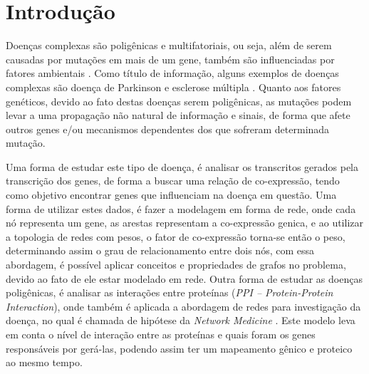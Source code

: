 \newcommand{\itab}[1]{\hspace{0em}\rlap{#1}}
\newcommand{\tab}[1]{\hspace{.2\textwidth}\rlap{#1}}
\chapter[Introdução]{Introdução}


Doenças complexas são poligênicas e multifatoriais, ou seja, além de serem causadas por mutações em mais de um gene, também são influenciadas por fatores ambientais \cite{davey-mith}. Como título de informação, alguns exemplos de doenças complexas são doença de Parkinson e esclerose múltipla \cite{Hunter-2005}. Quanto aos fatores genéticos, devido ao fato destas doenças serem poligênicas, as mutações podem levar a uma propagação não natural de informação e sinais, de forma que afete outros genes e/ou mecanismos dependentes dos que sofreram determinada mutação.




Uma forma de estudar este tipo de doença, é analisar os transcritos gerados pela transcrição dos genes, de forma a buscar uma relação de co-expressão, tendo como objetivo encontrar genes que influenciam na doença em questão. Uma forma de utilizar estes dados, é fazer a modelagem em forma de rede, onde cada nó representa um gene, as arestas representam a co-expressão genica, e ao utilizar a topologia de redes com pesos, o fator de co-expressão torna-se então o peso, determinando assim o grau de relacionamento entre dois nós, com essa abordagem, é possível aplicar conceitos e propriedades de grafos no problema, devido ao fato de ele estar modelado em rede.
Outra forma de estudar as doenças poligênicas, é analisar as interações entre proteínas (\textsl{PPI – Protein-Protein Interaction}), onde também é aplicada a abordagem de redes para investigação da doença, no qual é chamada de hipótese da \textsl{Network Medicine} \cite{Barabasi2011}. Este modelo leva em conta o nível de interação entre as proteínas e quais foram os genes responsáveis por gerá-las, podendo assim ter um mapeamento gênico e proteico ao mesmo tempo.

